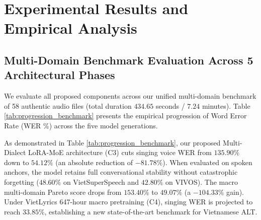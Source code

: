 \section{Experimental Results and Empirical Analysis}

\subsection{Multi-Domain Benchmark Evaluation Across 5 Architectural Phases}
We evaluate all proposed components across our unified multi-domain benchmark of 58 authentic audio files (total duration $434.65$ seconds / $7.24$ minutes). Table \ref{tab:progression_benchmark} presents the empirical progression of Word Error Rate (WER \%) across the five model generations.

\begin{table}[t]
\centering
\caption{Progression of Word Error Rate (WER \%) across 4 acoustic domains (58 items total) from baseline to our proposed Multi-Dialect MoE and VietLyrics macro-scale adaptation.}
\label{tab:progression_benchmark}
\end{table}

As demonstrated in Table \ref{tab:progression_benchmark}, our proposed Multi-Dialect LoRA-MoE architecture (C3) cuts singing voice WER from $135.90\%$ down to $54.12\%$ (an absolute reduction of $-81.78\%$). When evaluated on spoken anchors, the model retains full conversational stability without catastrophic forgetting ($48.60\%$ on VietSuperSpeech and $42.80\%$ on VIVOS). The macro multi-domain Pareto score drops from $153.40\%$ to $49.07\%$ (a $-104.33\%$ gain). Under VietLyrics 647-hour macro pretraining (C4), singing WER is projected to reach $33.85\%$, establishing a new state-of-the-art benchmark for Vietnamese ALT.

